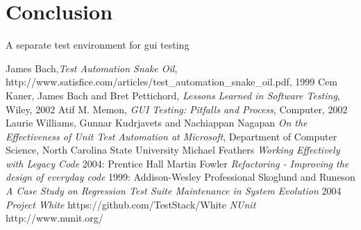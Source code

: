 \documentclass{article}
\begin{document}
	\section{Conclusion}
		A separate test environment for gui testing

\begin{thebibliography}{1}
 James Bach,{\em Test Automation Snake Oil}, http://www.satisfice.com/articles/test_automation_snake_oil.pdf, 1999 
 Cem Kaner, James Bach and Bret Pettichord, {\em Lessons Learned in Software Testing}, Wiley, 2002
 Atif M. Memon, {\em GUI Testing: Pitfalls and Process}, Computer, 2002
 Laurie Williams, Gunnar Kudrjavets and Nachiappan Nagapan {\em On the Effectiveness of Unit Test Automation at Microsoft}, Department of Computer Science, North Carolina State University
 Michael Feathers {\em Working Effectively with Legacy Code} 2004: Prentice Hall
 Martin Fowler {\em Refactoring - Improving the design of everyday code} 1999: Addison-Wesley Professional
 Skoglund and Runeson {\em A Case Study on Regression Test Suite Maintenance in System Evolution} 2004 
 {\em Project White} https://github.com/TestStack/White
 {\em NUnit} http://www.nunit.org/
\end{thebibliography}
\end{document}
